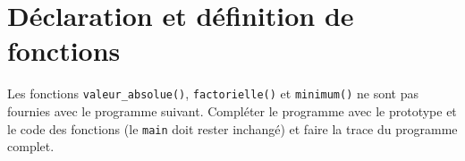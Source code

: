 \begin{correction}
\begin{table}[h]
  \end{table}
  \end{correction}
  
\section{Déclaration et définition de fonctions}

Les fonctions \verb+valeur_absolue()+, \verb+factorielle()+ et
\verb+minimum()+ ne sont pas fournies avec le programme
suivant. Compléter le programme avec le prototype et le code des
fonctions (le \verb+main+ doit rester inchangé) et
faire la trace du programme complet.

{\footnotesize
{}
}

